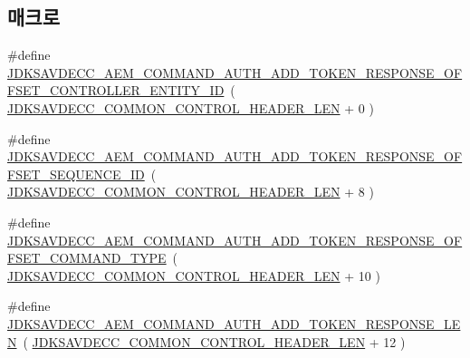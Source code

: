 \subsection*{매크로}
\begin{DoxyCompactItemize}
\item 
\#define \hyperlink{group__command__auth__add__token__response_gadb692d7cfcca5ad4e11ecf98066fd264}{J\+D\+K\+S\+A\+V\+D\+E\+C\+C\+\_\+\+A\+E\+M\+\_\+\+C\+O\+M\+M\+A\+N\+D\+\_\+\+A\+U\+T\+H\+\_\+\+A\+D\+D\+\_\+\+T\+O\+K\+E\+N\+\_\+\+R\+E\+S\+P\+O\+N\+S\+E\+\_\+\+O\+F\+F\+S\+E\+T\+\_\+\+C\+O\+N\+T\+R\+O\+L\+L\+E\+R\+\_\+\+E\+N\+T\+I\+T\+Y\+\_\+\+ID}~( \hyperlink{group__jdksavdecc__avtp__common__control__header_gaae84052886fb1bb42f3bc5f85b741dff}{J\+D\+K\+S\+A\+V\+D\+E\+C\+C\+\_\+\+C\+O\+M\+M\+O\+N\+\_\+\+C\+O\+N\+T\+R\+O\+L\+\_\+\+H\+E\+A\+D\+E\+R\+\_\+\+L\+EN} + 0 )
\item 
\#define \hyperlink{group__command__auth__add__token__response_gaf2ffc1887ccb1eea8f0854a322c0e587}{J\+D\+K\+S\+A\+V\+D\+E\+C\+C\+\_\+\+A\+E\+M\+\_\+\+C\+O\+M\+M\+A\+N\+D\+\_\+\+A\+U\+T\+H\+\_\+\+A\+D\+D\+\_\+\+T\+O\+K\+E\+N\+\_\+\+R\+E\+S\+P\+O\+N\+S\+E\+\_\+\+O\+F\+F\+S\+E\+T\+\_\+\+S\+E\+Q\+U\+E\+N\+C\+E\+\_\+\+ID}~( \hyperlink{group__jdksavdecc__avtp__common__control__header_gaae84052886fb1bb42f3bc5f85b741dff}{J\+D\+K\+S\+A\+V\+D\+E\+C\+C\+\_\+\+C\+O\+M\+M\+O\+N\+\_\+\+C\+O\+N\+T\+R\+O\+L\+\_\+\+H\+E\+A\+D\+E\+R\+\_\+\+L\+EN} + 8 )
\item 
\#define \hyperlink{group__command__auth__add__token__response_ga040f5b80c95f422b46023935202e46cc}{J\+D\+K\+S\+A\+V\+D\+E\+C\+C\+\_\+\+A\+E\+M\+\_\+\+C\+O\+M\+M\+A\+N\+D\+\_\+\+A\+U\+T\+H\+\_\+\+A\+D\+D\+\_\+\+T\+O\+K\+E\+N\+\_\+\+R\+E\+S\+P\+O\+N\+S\+E\+\_\+\+O\+F\+F\+S\+E\+T\+\_\+\+C\+O\+M\+M\+A\+N\+D\+\_\+\+T\+Y\+PE}~( \hyperlink{group__jdksavdecc__avtp__common__control__header_gaae84052886fb1bb42f3bc5f85b741dff}{J\+D\+K\+S\+A\+V\+D\+E\+C\+C\+\_\+\+C\+O\+M\+M\+O\+N\+\_\+\+C\+O\+N\+T\+R\+O\+L\+\_\+\+H\+E\+A\+D\+E\+R\+\_\+\+L\+EN} + 10 )
\item 
\#define \hyperlink{group__command__auth__add__token__response_ga56c0553f68a8395d3d6ee42519e8bc2c}{J\+D\+K\+S\+A\+V\+D\+E\+C\+C\+\_\+\+A\+E\+M\+\_\+\+C\+O\+M\+M\+A\+N\+D\+\_\+\+A\+U\+T\+H\+\_\+\+A\+D\+D\+\_\+\+T\+O\+K\+E\+N\+\_\+\+R\+E\+S\+P\+O\+N\+S\+E\+\_\+\+L\+EN}~( \hyperlink{group__jdksavdecc__avtp__common__control__header_gaae84052886fb1bb42f3bc5f85b741dff}{J\+D\+K\+S\+A\+V\+D\+E\+C\+C\+\_\+\+C\+O\+M\+M\+O\+N\+\_\+\+C\+O\+N\+T\+R\+O\+L\+\_\+\+H\+E\+A\+D\+E\+R\+\_\+\+L\+EN} + 12 )
\end{DoxyCompactItemize}
